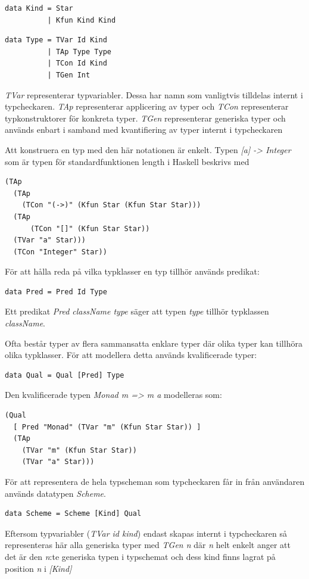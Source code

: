 \begin{lstlisting}
data Kind = Star
          | Kfun Kind Kind
\end{lstlisting}


\begin{lstlisting}
data Type = TVar Id Kind
          | TAp Type Type
          | TCon Id Kind
          | TGen Int     
\end{lstlisting}

\emph{TVar} representerar typvariabler. Dessa har namn som vanligtvis tilldelas internt i typcheckaren. \emph{TAp} representerar applicering av typer och \emph{TCon} representerar typkonstruktorer för konkreta typer. \emph{TGen} representerar
generiska typer och används enbart i samband med kvantifiering av
typer internt i typcheckaren

Att konstruera en typ med den här notationen är enkelt. Typen \emph{[a] ->
Integer} som är typen för standardfunktionen length i Haskell beskrivs med
\begin{lstlisting}
(TAp
  (TAp
    (TCon "(->)" (Kfun Star (Kfun Star Star)))
  (TAp
      (TCon "[]" (Kfun Star Star))
  (TVar "a" Star)))
  (TCon "Integer" Star))
\end{lstlisting}

För att hålla reda på vilka typklasser en typ tillhör används predikat:
\begin{lstlisting}
data Pred = Pred Id Type
\end{lstlisting}
Ett predikat \emph{Pred className type} säger att typen \emph{type} tillhör typklassen \emph{className}.

Ofta består typer av flera sammansatta enklare typer där olika typer kan tillhöra olika typklasser. För att modellera detta används kvalificerade typer:
\begin{lstlisting}
data Qual = Qual [Pred] Type
\end{lstlisting}

Den kvalificerade typen \emph{Monad m => m a} modelleras som:
\begin{lstlisting}
(Qual
  [ Pred "Monad" (TVar "m" (Kfun Star Star)) ]
  (TAp
    (TVar "m" (Kfun Star Star))
    (TVar "a" Star)))
\end{lstlisting}

För att representera de hela typscheman som typcheckaren får in från användaren används datatypen \emph{Scheme}.
\begin{lstlisting}
data Scheme = Scheme [Kind] Qual
\end{lstlisting}
Eftersom typvariabler (\emph{TVar id kind}) endast skapas internt i typcheckaren så representeras här alla generiska typer med \emph{TGen n} där \emph{n} helt enkelt anger att det är den \emph{n}:te generiska typen i typschemat och dess kind finns lagrat på position \emph{n} i \emph{[Kind]}

